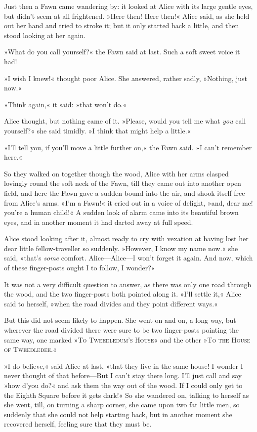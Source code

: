 Just then a Fawn came wandering by: it looked at Alice with its large gentle eyes, but didn't seem at all frightened. »Here then! Here then!« Alice said, as she held out her hand and tried to stroke it; but it only started back a little, and then stood looking at her again.

»What do you call yourself?« the Fawn said at last. Such a soft sweet voice it had!

»I wish I knew!« thought poor Alice. She answered, rather sadly, »Nothing, just now.«

»Think again,« it said: »that won't do.«

Alice thought, but nothing came of it. »Please, would you tell me what \textit{you} call yourself?« she said timidly. »I think that might help a little.«

»I'll tell you, if you'll move a little further on,« the Fawn said. »I can't remember here.«

So they walked on together though the wood, Alice with her arms clasped lovingly round the soft neck of the Fawn, till they came out into another open field, and here the Fawn gave a sudden bound into the air, and shook itself free from Alice's arms. »I'm a Fawn!« it cried out in a voice of delight, »and, dear me! you're a human child!« A sudden look of alarm came into its beautiful brown eyes, and in another moment it had darted away at full speed.

Alice stood looking after it, almost ready to cry with vexation at having lost her dear little fellow-traveller so suddenly. »However, I know my name now.« she said, »that's \textit{some} comfort. Alice—Alice—I won't forget it again. And now, which of these finger-posts ought I to follow, I wonder?«

It was not a very difficult question to answer, as there was only one road through the wood, and the two finger-posts both pointed along it. »I'll settle it,« Alice said to herself, »when the road divides and they point different ways.«

But this did not seem likely to happen. She went on and on, a long way, but wherever the road divided there were sure to be two finger-posts pointing the same way, one marked »\textsc{To Tweedledum's House}« and the other »\textsc{To the House of Tweedledee}.«

»I do believe,« said Alice at last, »that they live in the same house! I wonder I never thought of that before—But I can't stay there long. I'll just call and say »how d'you do?« and ask them the way out of the wood. If I could only get to the Eighth Square before it gets dark!« So she wandered on, talking to herself as she went, till, on turning a sharp corner, she came upon two fat little men, so suddenly that she could not help starting back, but in another moment she recovered herself, feeling sure that they must be.